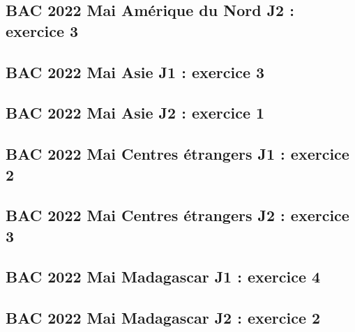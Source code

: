 \documentclass[lang=fr,edition=teacher,layout=sheet]{mxbook}
\begin{document}
\par\bigskip
{}\subsection*{BAC 2022 Mai Amérique du Nord J2 : exercice 3}
\begingroup\endgroup
\par\bigskip
{}\subsection*{BAC 2022 Mai Asie J1 : exercice 3}
\begingroup\endgroup
\par\bigskip
{}\subsection*{BAC 2022 Mai Asie J2 : exercice 1}
\begingroup\endgroup
\par\bigskip
{}\subsection*{BAC 2022 Mai Centres étrangers J1 : exercice 2}
\begingroup\endgroup
\par\bigskip
{}\subsection*{BAC 2022 Mai Centres étrangers J2 : exercice 3}
\begingroup\endgroup
\par\bigskip
{}\subsection*{BAC 2022 Mai Madagascar J1 : exercice 4}
\begingroup\endgroup
\par\bigskip
{}\subsection*{BAC 2022 Mai Madagascar J2 : exercice 2}
\end{document}
